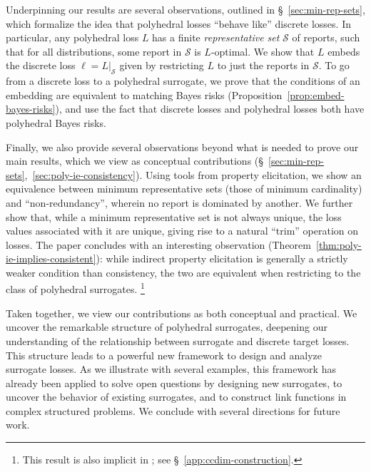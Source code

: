 \documentclass[twoside,11pt]{article}
\newcommand{\Sc}{\mathcal{S}}
\begin{document}
Underpinning our results are several observations, outlined in \S~\ref{sec:min-rep-sets}, which formalize the idea that polyhedral losses ``behave like'' discrete losses.
In particular, any polyhedral loss $L$ has a finite \emph{representative set} $\Sc$ of reports, such that for all distributions, some report in $\Sc$ is $L$-optimal.
We show that $L$ embeds the discrete loss $\ell = L|_\Sc$ given by restricting $L$ to just the reports in $\Sc$.
To go from a discrete loss to a polyhedral surrogate, we prove that the conditions of an embedding are equivalent to matching Bayes risks (Proposition~\ref{prop:embed-bayes-risks}), and use the fact that discrete losses and polyhedral losses both have polyhedral Bayes risks.

Finally, we also provide several observations beyond what is needed to prove our main results, which we view as conceptual contributions (\S~\ref{sec:min-rep-sets},~\ref{sec:poly-ie-consistency}).
Using tools from property elicitation, we show an equivalence between minimum representative sets (those of minimum cardinality) and ``non-redundancy'', wherein no report is dominated by another.
We further show that, while a minimum representative set is not always unique, the loss values associated with it are unique, giving rise to a natural ``trim'' operation on losses.
The paper concludes with an interesting observation (Theorem~\ref{thm:poly-ie-implies-consistent}): while indirect property elicitation is generally a strictly weaker condition than consistency, the two are equivalent when restricting to the class of polyhedral surrogates.%
\footnote{This result is also implicit in \citet[Theorem 8]{ramaswamy2016convex}; see \S~\ref{app:ccdim-construction}.}

Taken together, we view our contributions as both conceptual and practical.
We uncover the remarkable structure of polyhedral surrogates, deepening our understanding of the relationship between surrogate and discrete target losses.
This structure leads to a powerful new framework to design and analyze surrogate losses.
As we illustrate with several examples, this framework has already been applied to solve open questions by designing new surrogates, to uncover the behavior of existing surrogates, and to construct link functions in complex structured problems.
We conclude with several directions for future work.
\end{document}
